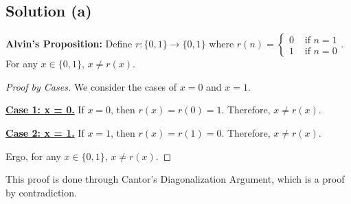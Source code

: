 \documentclass[11pt]{article}
\begin{document}
    \subsection{Solution (a)}
    \textbf{Alvin's Proposition: } Define $r: \{0, 1\} \to \{0, 1\}$ where $r(n) = \begin{cases} 0 &\text{ if } n = 1\\1 &\text{ if } n = 0 \end{cases}$.
    For any $x \in \{0, 1\}$, $x \neq r(x)$.
    \begin{proof}[Proof by Cases]
        We consider the cases of $x = 0$ and $x = 1$.

        \textbf{\underline{Case 1: x = 0.}}
        If $x = 0$, then $r(x) = r(0) = 1$.
        Therefore, $x \neq r(x)$.

        \textbf{\underline{Case 2: x = 1.}}
        If $x = 1$, then $r(x) = r(1) = 0$.
        Therefore, $x \neq r(x)$.

        Ergo, for any $x \in \{0, 1\}$, $x \neq r(x)$.
    \end{proof}
    This proof is done through Cantor's Diagonalization Argument, which is a proof by contradiction.
\end{document}
